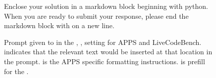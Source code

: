 \begin{figure*}[ht]
{{  
  Enclose your solution in a markdown block beginning with \textasciigrave\textasciigrave\textasciigrave python. When you are ready to submit your response, please end the markdown block with \textasciigrave\textasciigrave\textasciigrave on a new line.
  
  \vspace{0.4cm}


        }
        
    }
    \caption{Prompt given to \cm{} in the \para{}, \sent{}, \cf{} setting for APPS and LiveCodeBench.  indicates that the relevant text would be inserted at that location in the prompt.  is the APPS specific formatting instructions.  is prefill for the \cm{}. }
    \label{prompts:asst-nl_para_sent_apps_lcb}
\end{figure*}